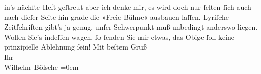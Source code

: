 \begin{ledgroupsized}[t]{13cm}
                    in’s nächſte Heft geſtreut {\pb}aber ich denke mir, es
                    wird doch nur ſelten ſich auch nach dieſer Seite hin grade die »Freie Bühne« ausbauen laſſen. Lyriſche Zeitſchriften gibt’s
                    ja genug, unſer Schwerpunkt muß unbedingt anderswo liegen. Wollen Sie’s indeſſen
                    wagen, ſo ſenden Sie mir etwas, das Obige ſoll keine prinzipielle Ablehnung
                    ſein!\pend
           \pstart
           Mit beſtem Gruß{\\[\baselineskip]}Ihr{\\[\baselineskip]}\spacefill\mbox{Wilhelm Bölsche}\pend
           \leftskip=0em{}\endnumbering{}\end{ledgroupsized}  \newcommand{\dateiname}{L00087}\newcommand{\titel}{Wilhelm Bölsche an Arthur Schnitzler, 24. 3. 1892}\newcommand{\editorInnen}{Martin Anton Müller und Gerd-Hermann Susen}
            \footnotesize
\begin{ledgroupsized}[t]{11.5cm}
\end{ledgroupsized}
         
      